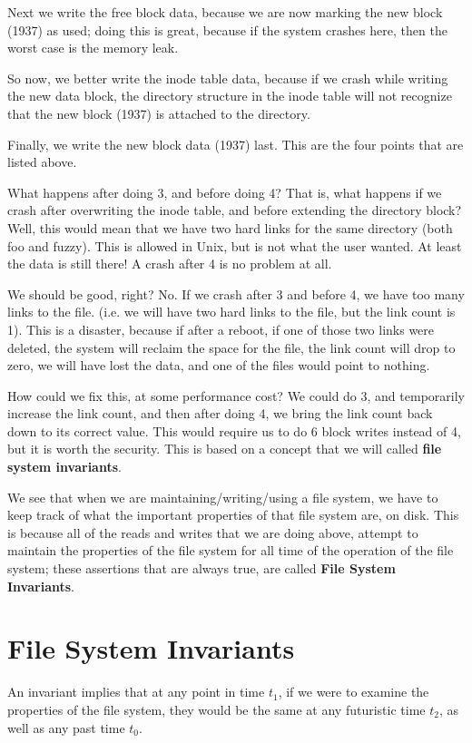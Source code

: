\documentclass[a4paper]{article}
\begin{document}
Next we write the free block data, because we are now marking the new block (1937) as used; doing this is great, because if the system crashes here, then the worst case is the memory leak. 

So now, we better write the inode table data, because if we crash while writing the new data block, the directory structure in the inode table will not recognize that the new block (1937) is attached to the directory.

Finally, we write the new block data (1937) last. This are the four points that are listed above. 

What happens after doing 3, and before doing 4?  That is, what happens if we crash after overwriting the inode table, and before extending the directory block? Well, this would mean that we have two hard links for the same directory (both foo and fuzzy). This is allowed in Unix, but is not what the user wanted. At least the data is still there! A crash after 4 is no problem at all.

We should be good, right? No. If we crash after 3 and before 4, we have too many links to the file. (i.e. we will have two hard links to the file, but the link count is 1). This is a disaster, because if after a reboot, if one of those two links were deleted, the system will reclaim the space for the file, the link count will drop to zero, we will have lost the data, and one of the files would point to nothing. 

How could we fix this, at some performance cost? We could do 3, and temporarily increase the link count, and then after doing 4, we bring the link count back down to its correct value. This would require us to do 6 block writes instead of 4, but it is worth the security. This is based on a concept that we will called \textbf{file system invariants}.

We see that when we are maintaining/writing/using a file system, we have to keep track of what the important properties of that file system are, on disk. This is because all of the reads and writes that we are doing above, attempt to maintain the properties of the file system for all time of the operation of the file system; these assertions that are always true, are called \textbf{File System Invariants}. 

\section{File System Invariants}
An invariant implies that at any point in time $t_1$, if we were to examine the properties of the file system, they would be the same at any futuristic time $t_2$, as well as any past time $t_0$. 
\end{document}
